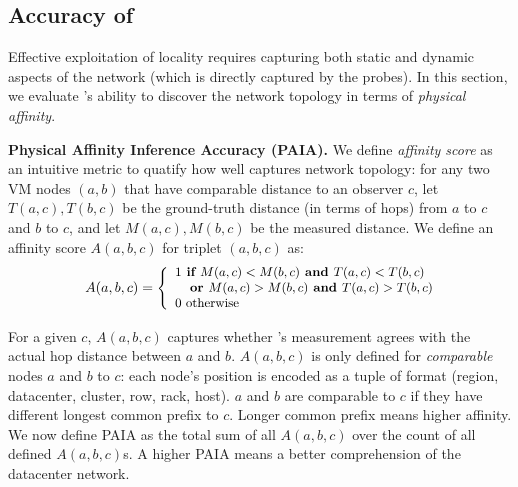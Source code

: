 \subsection{Accuracy of \marcopolo{}}
\label{sec:accuracy}
Effective exploitation of locality requires capturing both static and dynamic aspects of the network (which is directly captured by the probes). %
In this section, we evaluate \marcopolo{}'s ability to discover the network topology in terms of \textit{physical affinity}.

\noindent\textbf{Physical Affinity Inference Accuracy (PAIA).}
We define \textit{affinity score} as an intuitive metric to quatify how well \marcopolo{} captures network topology: for any two VM nodes $(a,b)$ that have comparable distance to an observer $c$, let $T(a,c), T(b,c)$ be the ground-truth distance (in terms of hops) from $a$ to $c$ and $b$ to $c$, and let $M(a,c), M(b,c)$ be the \marcopolo{} measured distance. We define an affinity score $A(a,b,c)$ for triplet $(a,b,c)$ as:
%
\begin{align*}
\small
  A(a,b,c) = 
   \left\lbrace
  \begin{array}{l@{}l}
    1 \textbf{ if $M(a,c) < M(b,c)$ and $T(a,c) < T(b,c)$}\\
    \textbf{\quad or $M(a,c) > M(b,c)$ and $T(a,c) > T(b,c)$} \\
    0 \text{ otherwise}
  \end{array}
  \right.
\end{align*}

For a given $c$, $A(a,b,c)$ captures whether \marcopolo{}'s measurement agrees with the actual hop distance between $a$ and $b$. $A(a,b,c)$ is only defined for \textit{comparable} nodes $a$ and $b$ to $c$: each node's position is encoded as a tuple of format %
(region, datacenter, cluster, row, rack, host).
$a$ and $b$ are comparable to $c$ if they have different longest common prefix to $c$. Longer common prefix means higher affinity. We now define PAIA as the total sum of all $A(a,b,c)$ over the count of all defined $A(a,b,c)$s. A higher PAIA means a better comprehension of the datacenter network.


